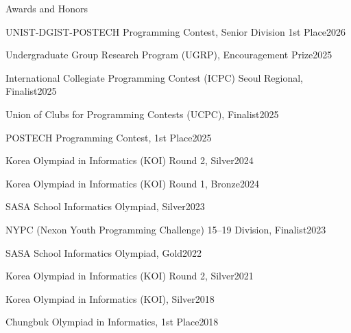 \documentclass{resume}
\begin{document}

\begin{res-section}{Awards and Honors}
  \begin{res-subsection}{UNIST-DGIST-POSTECH Programming Contest, Senior Division 1st Place}{2026}
  \end{res-subsection}

  \begin{res-subsection}{Undergraduate Group Research Program (UGRP), Encouragement Prize}{2025}
  \end{res-subsection}

  \begin{res-subsection}{International Collegiate Programming Contest (ICPC) Seoul Regional, Finalist}{2025}
  \end{res-subsection}

  \begin{res-subsection}{Union of Clubs for Programming Contests (UCPC), Finalist}{2025}
  \end{res-subsection}

  \begin{res-subsection}{POSTECH Programming Contest, 1st Place}{2025}
  \end{res-subsection}

  \begin{res-subsection}{Korea Olympiad in Informatics (KOI) Round 2, Silver}{2024}
  \end{res-subsection}

  \begin{res-subsection}{Korea Olympiad in Informatics (KOI) Round 1, Bronze}{2024}
  \end{res-subsection}

  \begin{res-subsection}{SASA School Informatics Olympiad, Silver}{2023}
  \end{res-subsection}

  \begin{res-subsection}{NYPC (Nexon Youth Programming Challenge) 15--19 Division, Finalist}{2023}
  \end{res-subsection}

  \begin{res-subsection}{SASA School Informatics Olympiad, Gold}{2022}
  \end{res-subsection}

  \begin{res-subsection}{Korea Olympiad in Informatics (KOI) Round 2, Silver}{2021}
  \end{res-subsection}

  \begin{res-subsection}{Korea Olympiad in Informatics (KOI), Silver}{2018}
  \end{res-subsection}

  \begin{res-subsection}{Chungbuk Olympiad in Informatics, 1st Place}{2018}
  \end{res-subsection}
\end{res-section}
\end{document}

